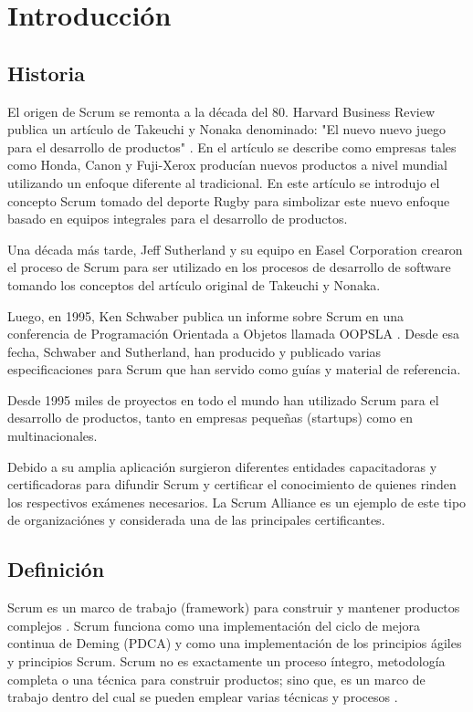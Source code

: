 \chapter{Introducción}

\section{Historia}

El origen de Scrum se remonta a la década del 80. Harvard Business Review publica un artículo de Takeuchi y Nonaka denominado: 
"El nuevo nuevo juego para el desarrollo de productos" \cite{Takeuchi-Nonaka-1986}. 
En el artículo se describe como empresas tales como Honda, Canon y Fuji-Xerox 
producían nuevos productos a nivel mundial utilizando un enfoque diferente al tradicional. En este artículo se introdujo el concepto
Scrum tomado del deporte Rugby para simbolizar este nuevo enfoque basado en equipos integrales para el desarrollo de productos. 

Una década más tarde, Jeff Sutherland y su equipo en Easel Corporation crearon el proceso de Scrum para ser utilizado en los procesos de 
desarrollo de software tomando los conceptos del artículo original de Takeuchi y Nonaka.

Luego, en 1995, Ken Schwaber publica un informe sobre Scrum en una conferencia de Programación Orientada a Objetos llamada OOPSLA 
\cite{Ken-Schwaber-1995}. Desde esa fecha, Schwaber and Sutherland, han producido y 
publicado varias especificaciones para Scrum que han servido como guías y material de referencia.

Desde 1995 miles de proyectos en todo el mundo han utilizado Scrum para el desarrollo de productos, tanto en empresas pequeñas (startups)
como en multinacionales.

Debido a su amplia aplicación surgieron diferentes entidades capacitadoras y certificadoras para difundir Scrum y certificar el conocimiento 
de quienes rinden los respectivos exámenes necesarios. La Scrum Alliance es un ejemplo de este tipo de organizaciónes y considerada una de las principales certificantes.


\section{Definición}

Scrum es un marco de trabajo  (framework) para construir y mantener productos complejos \cite{SBOK-2013} \cite{Scrum-Alliance-2015}. 
Scrum funciona como una implementación del ciclo de mejora continua de Deming (PDCA) y como una implementación de los principios ágiles y principios Scrum. 
Scrum no es exactamente un proceso íntegro, metodología completa o una técnica para construir productos; 
sino que, es un marco de trabajo dentro del cual se pueden emplear varias técnicas y procesos \cite{Agile-Atlas-2012}. 

